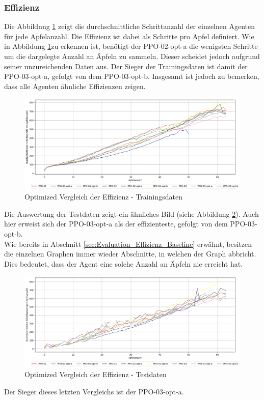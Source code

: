 \subsubsection{Effizienz}
Die Abbildung \ref{fig:Evaluation_Effizienz_Optimized} zeigt die durchschnittliche Schrittanzahl der einzelnen Agenten für jede Apfelanzahl. Die Effizienz ist dabei als Schritte pro Apfel definiert. Wie in Abbildung \ref{fig:Evaluation_Effizienz_Optimized}zu erkennen ist, benötigt der PPO-02-opt-a die wenigsten Schritte um die dargelegte Anzahl an Äpfeln zu sammeln. Dieser scheidet jedoch aufgrund seiner unzureichenden Daten aus. Der Sieger der Trainingsdaten ist damit der PPO-03-opt-a, gefolgt von dem PPO-03-opt-b. Insgesamt ist jedoch zu bemerken, dass alle Agenten ähnliche Effizienzen zeigen.
\begin{figure}[H]
	\centering
	\includegraphics[scale=0.4517]{Abbildungen/Evaluation/optimized-effizienz.png}
	\caption[Optimized Vergleich Effizienz]{Optimized Vergleich der Effizienz - Trainingsdaten}
	\label{fig:Evaluation_Effizienz_Optimized}
\end{figure}
Die Auswertung der Testdaten zeigt ein ähnliches Bild (siehe Abbildung \ref{fig:Evaluation_Effizienz2_Optimized}). Auch hier erweist sich der PPO-03-opt-a als der effizienteste, gefolgt von dem PPO-03-opt-b.\\
Wie bereits in Abschnitt \ref{sec:Evaluation_Effizienz_Baseline} erwähnt, besitzen die einzelnen Graphen immer wieder Abschnitte, in welchen der Graph abbricht. Dies bedeutet, dass der Agent eine solche Anzahl an Äpfeln nie erreicht hat.
\begin{figure}[H]
	\centering
	\includegraphics[scale=0.4517]{Abbildungen/Evaluation/optimized-effizienz2.png}
	\caption[Optimized Vergleich Effizienz]{Optimized Vergleich der Effizienz - Testdaten}
	\label{fig:Evaluation_Effizienz2_Optimized}
\end{figure}
Der Sieger dieses letzten Vergleichs ist der PPO-03-opt-a.


